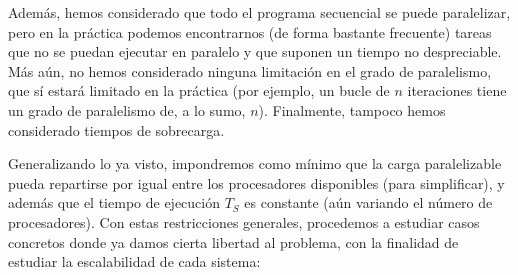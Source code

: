 Además, hemos considerado que todo el programa secuencial se puede paralelizar, pero en la práctica podemos encontrarnos (de forma bastante frecuente) tareas que no se puedan ejecutar en paralelo y que suponen un tiempo no despreciable. Más aún, no hemos considerado ninguna limitación en el grado de paralelismo, que sí estará limitado en la práctica (por ejemplo, un bucle de $n$ iteraciones tiene un grado de paralelismo de, a lo sumo, $n$). Finalmente, tampoco hemos considerado tiempos de sobrecarga.

Generalizando lo ya visto, impondremos como mínimo que la carga paralelizable pueda repartirse por igual entre los procesadores disponibles (para simplificar), y además que el tiempo de ejecución $T_S$ es constante (aún variando el número de procesadores). Con estas restricciones generales, procedemos a estudiar casos concretos donde ya damos cierta libertad al problema, con la finalidad de estudiar la escalabilidad de cada sistema:
